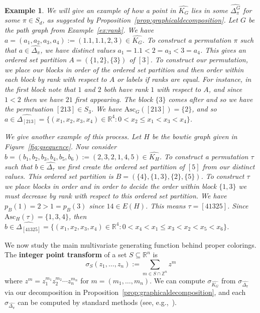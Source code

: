 \documentclass[11pt]{amsart}
\newtheorem{exam}{Example}
\newenvironment{example}{\begin{exam}\sf}{\end{exam}}
\newcommand\Def[1]{{\bf #1}}
\newcommand{\rk}[1][\pi]{p_{#1}}
\newcommand{\asc}{\mathrm{Asc}}
\begin{document}
\begin{example}\label{ex:uniquepermcone}
    We will give an example of how a point in $\widehat{K_G}$ lies in some $\widehat{\Delta_\pi^G}$ for some
$\pi \in S_d$, as suggested by Proposition~\ref{prop:graphicaldecomposition}.
    Let $G$ be the path graph from Example~\ref{ex:rank}. We have $a= (a_1,a_2,a_3,a_4) := (1.1,1.1,2,3)  \in \widehat{K_G}$. 
    To construct a permutation $\pi$ such that $a \in \widehat{\Delta_\pi}$, we have distinct values $a_1=1.1 <2=a_3<3=a_4$.
    This gives an ordered set partition $A=(\{1,2 \},\{3\})$ of $[3]$.
    To construct our permutation, we place our blocks in order of the ordered set partition and then order within each block by rank with respect to $A$ or labels if ranks are equal.
    For instance, in the first block note that $1$ and $2$ both have rank $1$ with respect to $A$, and since $1<2$ then we have $21$ first appearing. 
    The block $\{3\}$ comes after and so we have the permtuation $[213] \in S_3$.
    We have $\asc_G([213]) = \{2\}$, and so $a \in \widehat{\Delta_{[213]}} = \{(x_1,x_2,x_3,x_4) \in \mathbb{R}^4 : 0<x_2 \leq x_1 < x_3 < x_4\}$. 

    We give another example of this process. Let $H$ be the bowtie graph given in Figure~\ref{fig:gsequence}.
    Now consider $b=(b_1,b_2,b_3,b_4,b_5,b_6) := (2,3,2,1,4,5) \in \widehat{K_H}$.
    To construct a permutation $\tau$ such that $b \in \widehat{\Delta_\tau}$ we first create the ordered set partition of $[5]$ from our distinct values.
    This ordered set partition is $B=(\{4\},\{1,3\},\{2\},\{5\})$. 
    To construct $\tau$ we place blocks in order and in order to decide the order within block $\{1,3\}$ we must decrease by rank with respect to this ordered set partition. We have $\rk[B](1) = 2 > 1=\rk[B](3)$ since $14 \in E(H)$. 
    This means $\tau = [41325]$.
    Since $\asc_H(\tau) = \{1,3,4\}$, then $b \in \widehat{\Delta_{[41325]}} = \{(x_1,x_2,x_3,x_4) \in \mathbb{R}^4 : 0<x_4 < x_1 \leq x_3 < x_2 < x_5 < x_6\}$.
\end{example}

We now study the main multivariate generating function behind proper colorings. 
The \Def{integer point transform} of a set $S \subseteq \mathbb{R}^n$ is 
\[
    \sigma_S(z_1,\ldots,z_{n}) := \sum_{m \in S \cap \mathbb{Z}^n} z^m
\]
where $z^m = z_1^{m_1}z_2^{m_2} \cdots z_n^{m_n}$ for $m=(m_1,\ldots,m_n)$.
We can compute $\sigma_{\widehat{K_G}}$ from $\sigma_{\widehat{\Delta_\pi}}$ via our decomposition in
Proposition~\ref{prop:graphicaldecomposition}, and each $\sigma_{\widehat{\Delta_\pi}}$ can be computed by
standard methods (see, e.g.,~\cite{crt}).
\end{document}
